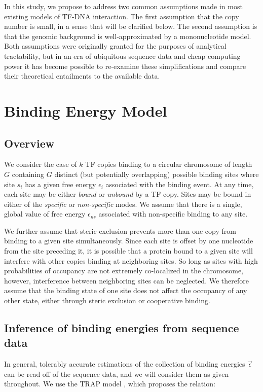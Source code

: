 \documentclass{article}
\begin{document}
In this study, we propose to address two common assumptions made in
most existing models of TF-DNA interaction.  The first assumption that
the copy number is small, in a sense that will be clarified below.
The second assumption is that the genomic background is
well-approximated by a mononucleotide model.  Both assumptions were
originally granted for the purposes of analytical tractability, but in
an era of ubiquitous sequence data and cheap computing power it has
become possible to re-examine these simplifications and compare their
theoretical entailments to the available data.

\section{Binding Energy Model}
\subsection{Overview}
We consider the case of $k$ TF copies binding to a circular chromosome
of length $G$ containing $G$ distinct (but potentially overlapping)
possible binding sites where site $s_i$ has a given free energy
$\epsilon_i $ associated with the binding event.  At any time, each
site may be either \textit{bound} or \textit{unbound} by a TF copy.
Sites may be bound in either of the \textit{specific} or
\textit{non-specific} modes.  We assume that there is a single, global
value of free energy $\epsilon_{ns}$ associated with non-specific
binding to any site.


We further assume that steric exclusion prevents more than one copy
from binding to a given site simultaneously.  Since each site is
offset by one nucleotide from the site preceding it, it is possible
that a protein bound to a given site will interfere with other copies
binding at neighboring sites.  So long as sites with high
probabilities of occupancy are not extremely co-localized in the
chromosome, however, interference between neighboring sites can be
neglected.  We therefore assume that the binding state of one site
does not affect the occupancy of any other state, either through
steric exclusion or cooperative binding.


\subsection{Inference of binding energies from sequence data}
In general, tolerably accurate estimations of the collection of
binding energies $\vec{\epsilon}$ can be read off of the sequence
data, and we will consider them as given throughout.  We use the TRAP
model \cite{roider07}, which proposes the relation:
\end{document}
